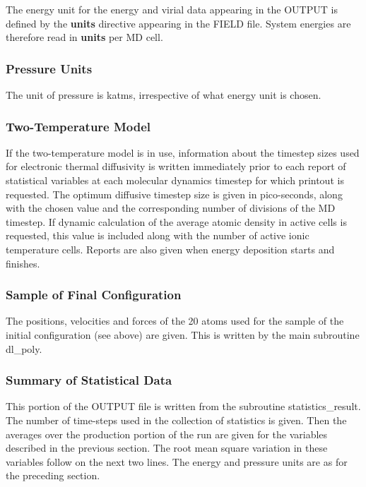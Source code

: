 The energy unit for the energy and virial data appearing in the
OUTPUT is defined by the {\bf units} directive appearing in the
FIELD file.  System energies are therefore read in {\bf units}
per MD cell.

\subsubsection*{Pressure Units}

The unit of pressure is katms, irrespective
of what energy unit is chosen.

\subsubsection*{Two-Temperature Model}

If the two-temperature model is
in use, information about the timestep sizes used for electronic
thermal diffusivity is written immediately prior to each report of
statistical variables at each molecular dynamics timestep for which
printout is requested. The optimum diffusive timestep size is given
in pico-seconds, along with the chosen value and the corresponding
number of divisions of the MD timestep. If dynamic calculation of
the average atomic density in active cells is requested, this value is
included along with the number of active ionic temperature cells.
Reports are also given when energy deposition starts and finishes.

\subsubsection{Sample of Final Configuration}

The positions, velocities and forces of the 20 atoms used for the
sample of the initial configuration (see above) are given.  This
is written by the main subroutine {\sc dl\_poly}.

\subsubsection{Summary of Statistical Data}

This portion of the OUTPUT file is written from the subroutine
{\sc statistics\_result}.  The number of time-steps used in the
collection of statistics is given.  Then the averages over the
production portion of the run are given for the variables
described in the previous section.  The root mean square variation
in these variables follow on the next two lines.  The
energy and pressure
units are as for the preceding section.

